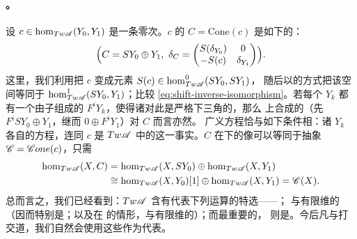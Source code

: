 \paragraph{\trMappingCone。}\label{sub:mapping-cones}
设 $c\in\hom_{Tw\mathscr{A}}(Y_0,Y_1)$ 是一条零次\trCocycle。$c$ 的\trMappingCone{}%
$C=\mathrm{Cone}(c)$ 是如下的\trTwistedComplex：
\begin{equation}\label{eq:mapping-cone-twisted-complex}
\Bigl(C=SY_0\oplus Y_1,\ \delta_C=
\begin{pmatrix}S(\delta_{Y_0}) & 0\\ -S(c) & \delta_{Y_1}\end{pmatrix}\Bigr).
\end{equation}
这里，我们利用\trShiftFunctor{}把 $c$ 变成元素 $S(c)\in\hom^0_{Tw\mathscr{A}}(SY_0,SY_1)$，
随后以\trTautological{}的方式把该空间等同于 $\hom^1_{Tw\mathscr{A}}(SY_0,Y_1)$；比较
\eqref{eq:shift-inverse-isomorphism}。若每个 $Y_k$ 都有一个由子\trComplex{}组成的%
\trFiltration{} $F^iY_k$，使得诸\trDifferential{}对此是严格下三角的，那么\trMappingCone{}%
上合成的\trFiltration（先 $F^iSY_0\oplus Y_1$，继而 $0\oplus F^iY_1$）对 $C$ 而言亦然。
广义\trMaurerCartan{}方程恰与如下条件相\trEquivalence：诸 $Y_k$ 各自的方程，连同
$c$ 是 $Tw\mathscr{A}$ 中的\trCocycle{}这一事实。$C$ 在\trYonedaEmbedding{}下的像可以等同于抽象\trMappingCone{}%
$\mathscr{C}=\mathscr{C}one(c)$，只需
\begin{equation*}
\begin{split}
\hom_{Tw\mathscr{A}}(X,C)&=\hom_{Tw\mathscr{A}}(X,SY_0)\oplus\hom_{Tw\mathscr{A}}(X,Y_1)\\
&\cong\hom_{Tw\mathscr{A}}(X,Y_0)[1]\oplus\hom_{Tw\mathscr{A}}(X,Y_1)=\mathscr{C}(X).
\end{split}
\end{equation*}
总而言之，我们已经看到：$Tw\mathscr{A}$ 含有代表下列运算的特选\trObject{}——\trDirectSum；
与有限维\trGraded\trVectorSpace{}的\trTensorProduct{}（因而特别是\trSuspension；以及在%
\trStrictlyUnital{}的情形，与有限维\trChainComplex{}的\trTensorProduct{}）；而最重要的，
则是\trMappingCone。今后凡与\trTwistedComplex{}打交道，我们自然会使用这些\trObject{}作为代表。

